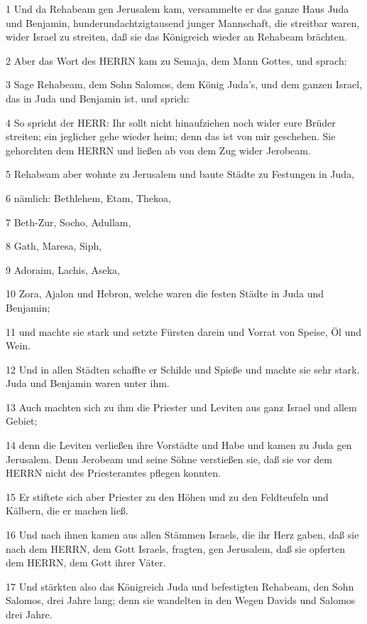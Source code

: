\par 1 Und da Rehabeam gen Jerusalem kam, versammelte er das ganze Haus Juda und Benjamin, hunderundachtzigtausend junger Mannschaft, die streitbar waren, wider Israel zu streiten, daß sie das Königreich wieder an Rehabeam brächten.
\par 2 Aber das Wort des HERRN kam zu Semaja, dem Mann Gottes, und sprach:
\par 3 Sage Rehabeam, dem Sohn Salomos, dem König Juda's, und dem ganzen Israel, das in Juda und Benjamin ist, und sprich:
\par 4 So spricht der HERR: Ihr sollt nicht hinaufziehen noch wider eure Brüder streiten; ein jeglicher gehe wieder heim; denn das ist von mir geschehen. Sie gehorchten dem HERRN und ließen ab von dem Zug wider Jerobeam.
\par 5 Rehabeam aber wohnte zu Jerusalem und baute Städte zu Festungen in Juda,
\par 6 nämlich: Bethlehem, Etam, Thekoa,
\par 7 Beth-Zur, Socho, Adullam,
\par 8 Gath, Maresa, Siph,
\par 9 Adoraim, Lachis, Aseka,
\par 10 Zora, Ajalon und Hebron, welche waren die festen Städte in Juda und Benjamin;
\par 11 und machte sie stark und setzte Fürsten darein und Vorrat von Speise, Öl und Wein.
\par 12 Und in allen Städten schaffte er Schilde und Spieße und machte sie sehr stark. Juda und Benjamin waren unter ihm.
\par 13 Auch machten sich zu ihm die Priester und Leviten aus ganz Israel und allem Gebiet;
\par 14 denn die Leviten verließen ihre Vorstädte und Habe und kamen zu Juda gen Jerusalem. Denn Jerobeam und seine Söhne verstießen sie, daß sie vor dem HERRN nicht des Priesteramtes pflegen konnten.
\par 15 Er stiftete sich aber Priester zu den Höhen und zu den Feldteufeln und Kälbern, die er machen ließ.
\par 16 Und nach ihnen kamen aus allen Stämmen Israels, die ihr Herz gaben, daß sie nach dem HERRN, dem Gott Israels, fragten, gen Jerusalem, daß sie opferten dem HERRN, dem Gott ihrer Väter.
\par 17 Und stärkten also das Königreich Juda und befestigten Rehabeam, den Sohn Salomos, drei Jahre lang; denn sie wandelten in den Wegen Davids und Salomos drei Jahre.
